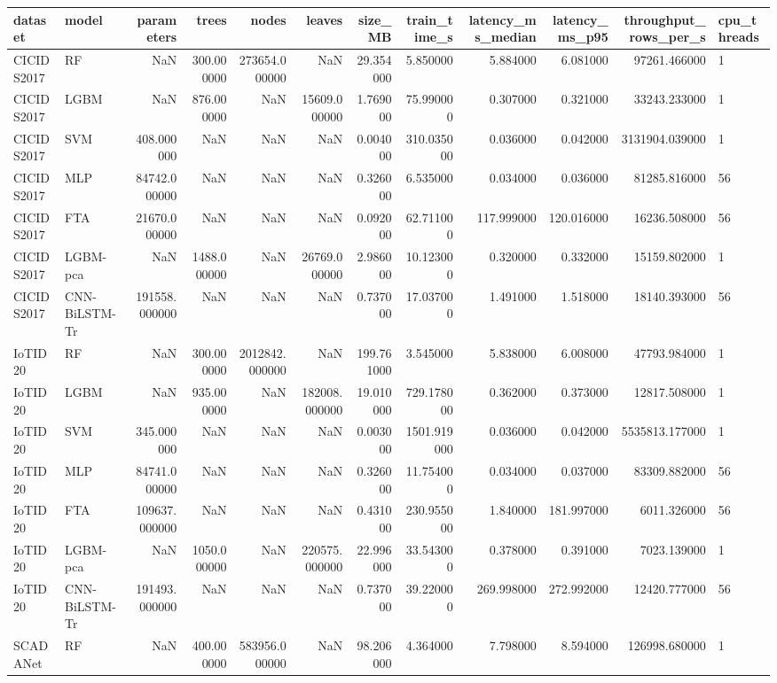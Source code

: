 \begin{tabular}{llrrrrrrrrrl}
\toprule
dataset & model & parameters & trees & nodes & leaves & size\_MB & train\_time\_s & latency\_ms\_median & latency\_ms\_p95 & throughput\_rows\_per\_s & cpu\_threads \\
\midrule
CICIDS2017 & RF & NaN & 300.000000 & 273654.000000 & NaN & 29.354000 & 5.850000 & 5.884000 & 6.081000 & 97261.466000 & 1 \\
CICIDS2017 & LGBM & NaN & 876.000000 & NaN & 15609.000000 & 1.769000 & 75.990000 & 0.307000 & 0.321000 & 33243.233000 & 1 \\
CICIDS2017 & SVM & 408.000000 & NaN & NaN & NaN & 0.004000 & 310.035000 & 0.036000 & 0.042000 & 3131904.039000 & 1 \\
CICIDS2017 & MLP & 84742.000000 & NaN & NaN & NaN & 0.326000 & 6.535000 & 0.034000 & 0.036000 & 81285.816000 & 56 \\
CICIDS2017 & FTA & 21670.000000 & NaN & NaN & NaN & 0.092000 & 62.711000 & 117.999000 & 120.016000 & 16236.508000 & 56 \\
CICIDS2017 & LGBM-pca & NaN & 1488.000000 & NaN & 26769.000000 & 2.986000 & 10.123000 & 0.320000 & 0.332000 & 15159.802000 & 1 \\
CICIDS2017 & CNN-BiLSTM-Tr & 191558.000000 & NaN & NaN & NaN & 0.737000 & 17.037000 & 1.491000 & 1.518000 & 18140.393000 & 56 \\
IoTID20 & RF & NaN & 300.000000 & 2012842.000000 & NaN & 199.761000 & 3.545000 & 5.838000 & 6.008000 & 47793.984000 & 1 \\
IoTID20 & LGBM & NaN & 935.000000 & NaN & 182008.000000 & 19.010000 & 729.178000 & 0.362000 & 0.373000 & 12817.508000 & 1 \\
IoTID20 & SVM & 345.000000 & NaN & NaN & NaN & 0.003000 & 1501.919000 & 0.036000 & 0.042000 & 5535813.177000 & 1 \\
IoTID20 & MLP & 84741.000000 & NaN & NaN & NaN & 0.326000 & 11.754000 & 0.034000 & 0.037000 & 83309.882000 & 56 \\
IoTID20 & FTA & 109637.000000 & NaN & NaN & NaN & 0.431000 & 230.955000 & 1.840000 & 181.997000 & 6011.326000 & 56 \\
IoTID20 & LGBM-pca & NaN & 1050.000000 & NaN & 220575.000000 & 22.996000 & 33.543000 & 0.378000 & 0.391000 & 7023.139000 & 1 \\
IoTID20 & CNN-BiLSTM-Tr & 191493.000000 & NaN & NaN & NaN & 0.737000 & 39.220000 & 269.998000 & 272.992000 & 12420.777000 & 56 \\
SCADANet & RF & NaN & 400.000000 & 583956.000000 & NaN & 98.206000 & 4.364000 & 7.798000 & 8.594000 & 126998.680000 & 1 \\

\end{tabular}
